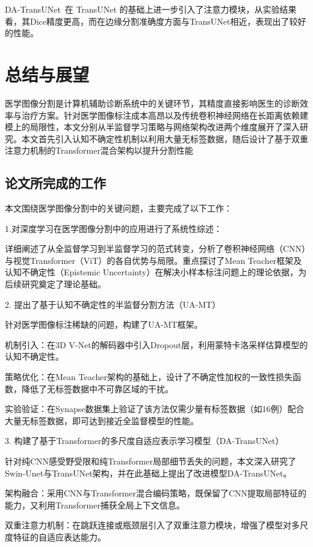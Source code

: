\documentclass[twoside,openright]{xduugthesis}
\begin{document}
DA-TransUNet 在 TransUNet 的基础上进一步引入了注意力模块，从实验结果看，其Dice精度更高，而在边缘分割准确度方面与TransUNet相近，表现出了较好的性能。

\chapter{总结与展望}
医学图像分割是计算机辅助诊断系统中的关键环节，其精度直接影响医生的诊断效率与治疗方案。针对医学图像标注成本高昂以及传统卷积神经网络在长距离依赖建模上的局限性，本文分别从半监督学习策略与网络架构改进两个维度展开了深入研究。本文首先引入认知不确定性机制以利用大量无标签数据，随后设计了基于双重注意力机制的Transformer混合架构以提升分割性能

\section{论文所完成的工作}

本文围绕医学图像分割中的关键问题，主要完成了以下工作：

1.对深度学习在医学图像分割中的应用进行了系统性综述：

详细阐述了从全监督学习到半监督学习的范式转变，分析了卷积神经网络（CNN）与视觉Transformer（ViT）的各自优势与局限。重点探讨了Mean Teacher框架及认知不确定性（Epistemic Uncertainty）在解决小样本标注问题上的理论依据，为后续研究奠定了理论基础。

2. 提出了基于认知不确定性的半监督分割方法（UA-MT）

针对医学图像标注稀缺的问题，构建了UA-MT框架。

机制引入：在3D V-Net的解码器中引入Dropout层，利用蒙特卡洛采样估算模型的认知不确定性。

策略优化：在Mean Teacher架构的基础上，设计了不确定性加权的一致性损失函数，降低了无标签数据中不可靠区域的干扰。

实验验证：在Synapse数据集上验证了该方法仅需少量有标签数据（如16例）配合大量无标签数据，即可达到接近全监督模型的性能。

3. 构建了基于Transformer的多尺度自适应表示学习模型（DA-TransUNet）

针对纯CNN感受野受限和纯Transformer局部细节丢失的问题，本文深入研究了Swin-Unet与TransUNet架构，并在此基础上提出了改进模型DA-TransUNet。

架构融合：采用CNN与Transformer混合编码策略，既保留了CNN提取局部特征的能力，又利用Transformer捕获全局上下文信息。

双重注意力机制：在跳跃连接或瓶颈层引入了双重注意力模块，增强了模型对多尺度特征的自适应表达能力。
\end{document}
